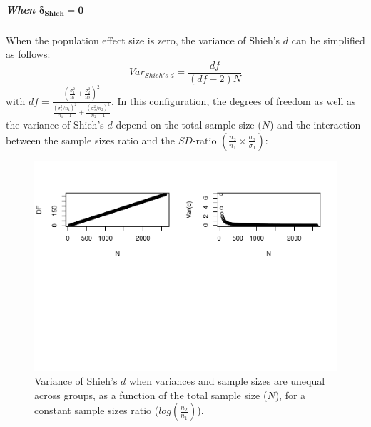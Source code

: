 \documentclass[
  english,
  man,mask]{apa6}
\let\oldsubparagraph\subparagraph
\renewcommand{\subparagraph}[1]{\oldsubparagraph{#1}\mbox{}}
\begin{document}
\hypertarget{when-bmdelta_shieh-0-2}{%
\subparagraph{\texorpdfstring{When \(\bm{\delta_{Shieh} = 0}\)}{When \textbackslash bm\{\textbackslash delta\_\{Shieh\} = 0\}}}\label{when-bmdelta_shieh-0-2}}

When the population effect size is zero, the variance of Shieh's \(d\) can be simplified as follows:
\[Var_{Shieh's \; d} = \frac{df}{(df-2)N}\]
with \(df = \frac{\left(\frac{\sigma^2_1}{n_1}+\frac{\sigma^2_2}{n_2} \right)^2}{\frac{(\sigma^2_1/n_1)^2}{n_1-1}+\frac{(\sigma^2_2/n_2)^2}{n_2-1}}\). In this configuration, the degrees of freedom as well as the variance of Shieh's \(d\) depend on the total sample size (\(N\)) and the interaction between the sample sizes ratio and the \(SD\)-ratio \(\left(\frac{n_2}{n_1}\times\frac{\sigma_2}{\sigma_1} \right)\):

\begin{figure}
\centering
\includegraphics{SupMat1_files/figure-latex/varshiehhetunbalNsize2-1.pdf}
\caption{\label{fig:varshiehhetunbalNsize2}Variance of Shieh's \(d\) when variances and sample sizes are unequal across groups, as a function of the total sample size (\(N\)), for a constant sample sizes ratio (\(log\left(\frac{n_2}{n_1} \right)\)).}
\end{figure}
\end{document}
